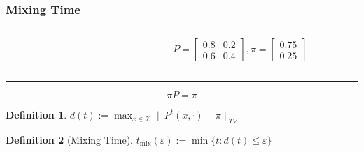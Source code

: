 \documentclass{beamer}
\newtheorem{define}{Definition}
\begin{document}
\begin{frame}
  \frametitle{Mixing Time}
  \begin{example}
    \begin{columns}
      \begin{column}{0.35\textwidth}
        \centering {}
      \end{column}
      \vrule
      \begin{column}{0.65\textwidth}
        \[P =\left[
            \begin{array}{cc}
              0.8 & 0.2 \\
              0.6 & 0.4 
            \end{array}
          \right],
          \pi = \left[
            \begin{array}{c}
              0.75 \\
              0.25
            \end{array}
          \right]\]
      \end{column}
    \end{columns} 
    \hspace{2mm}
    \hrule
    \[\pi P = \pi\]
  \end{example}
  \begin{define}
    \centering $d(t) := \max_{x\in\mathcal{X}} \parallel P^t(x, \cdot) - \pi \parallel_{TV}$
  \end{define}
  \begin{define}[Mixing Time]
    \centering $t_{\mathrm{mix}}(\varepsilon) := \min\{t: d(t) \leq \varepsilon\}$
  \end{define}
\end{frame}



\end{document}
